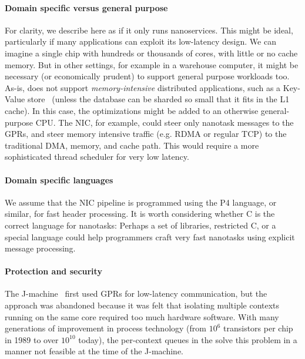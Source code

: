 
\paragraph{Domain specific versus general purpose} For clarity, we describe \name{} here as if it only runs nanoservices. This might be ideal, particularly if many applications can exploit its low-latency design. We can imagine a single chip with hundreds or thousands of \name{} cores, with little or no cache memory. But in other settings, for example in a warehouse computer, it might be necessary (or economically prudent) to support general purpose workloads too. As-is, \name{} does not support \emph{memory-intensive} distributed applications, such as a Key-Value store~\cite{memcached} (unless the database can be sharded so small that it fits in the L1 cache). In this case, the \name{} optimizations might be added to an otherwise general-purpose CPU. The NIC, for example, could steer only nanotask messages to the GPRs, and steer memory intensive traffic (e.g. RDMA or regular TCP) to the traditional DMA, memory, and cache path. This would require a more sophisticated thread scheduler for very low latency.

\paragraph{Domain specific languages} We assume that the NIC pipeline is programmed using the P4 language, or similar, for fast header processing. It is worth considering whether C is the correct language for nanotasks: Perhaps a set of libraries, restricted C, or a special language could help programmers craft very fast nanotasks using explicit message processing.

\paragraph{Protection and security} The J-machine~\cite{jmachine} first used GPRs for low-latency communication, but the approach was abandoned because it was felt that isolating multiple contexts running on the same core required too much hardware software. With many generations of improvement in process technology (from $10^6$ transistors per chip in 1989 to over $10^10$ today), the per-context queues in the \name{} solve this problem in a manner not feasible at the time of the J-machine. 


